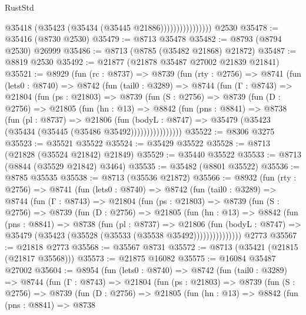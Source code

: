 \begin{lexlean}{RustStd}
\begin{coremodule}
                            @35418 (@35423 (@35434 (@35445 @21886))))))))))))))))
    @2530
@35478 := @35416 (@8730 @2530)
@35479 := @8713 @35478
@35482 := @8793 (@8794 @2530) @26999
@35486 := @8713 (@8785 (@35482 @21868) @21872)
@35487 := @8819 @2530
@35492 := @21877 (@21878 @35487 @27002 @21839 @21841)
@35521 := @8929
    (fun (rc : @8737) =>
    @8739
      (fun (rty : @2756) =>
      @8741
        (fun (lets0 : @8740) =>
        @8742
          (fun (tail0 : @3289) =>
          @8744
            (fun (Γ : @8743) =>
            @21804
              (fun (ps : @21803) =>
              @8739
                (fun (S : @2756) =>
                @8739
                  (fun (D : @2756) =>
                  @21805
                    (fun (hn : @13) =>
                    @8842
                      (fun (pns : @8841) =>
                      @8738
                        (fun (pl : @8737) =>
                        @21806
                          (fun (bodyL : @8747) =>
                          @35479 (@35423 (@35434 (@35445 (@35486 @35492))))))))))))))))
@35522 := @8306 @3275
@35523 := @35521 @35522
@35524 := @35429 @35522
@35528 := @8713 (@21828 (@35524 @21842) @21849)
@35529 := @35440 @35522
@35533 := @8713 (@8844 (@35529 @21842) @3464)
@35535 := @35482 (@8801 @35522)
@35536 := @8785 @35535
@35538 := @8713 (@35536 @21872)
@35566 := @8932
    (fun (rty : @2756) =>
    @8741
      (fun (lets0 : @8740) =>
      @8742
        (fun (tail0 : @3289) =>
        @8744
          (fun (Γ : @8743) =>
          @21804
            (fun (ps : @21803) =>
            @8739
              (fun (S : @2756) =>
              @8739
                (fun (D : @2756) =>
                @21805
                  (fun (hn : @13) =>
                  @8842
                    (fun (pns : @8841) =>
                    @8738
                      (fun (pl : @8737) =>
                      @21806
                        (fun (bodyL : @8747) =>
                        @35479 (@35423 (@35528 (@35533 (@35538 @35492)))))))))))))))
    @2773
@35567 := @21818 @2773
@35568 := @35567 @8731
@35572 := @8713 (@35421 (@21815 (@21817 @35568)))
@35573 := @21875 @16082
@35575 := @16084 @35487 @27002
@35604 := @8954
    (fun (lets0 : @8740) =>
    @8742
      (fun (tail0 : @3289) =>
      @8744
        (fun (Γ : @8743) =>
        @21804
          (fun (ps : @21803) =>
          @8739
            (fun (S : @2756) =>
            @8739
              (fun (D : @2756) =>
              @21805
                (fun (hn : @13) =>
                @8842
                  (fun (pns : @8841) =>
                  @8738

\end{coremodule}
\end{lexlean}
